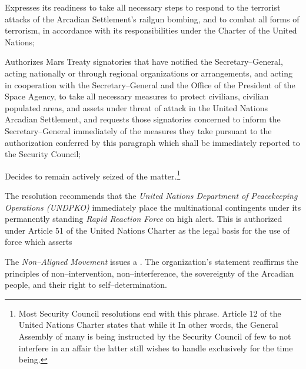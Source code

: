 \item Expresses its readiness to take all necessary steps to respond to the terrorist attacks of the Arcadian Settlement's railgun bombing, and to combat all forms of terrorism, in accordance with its responsibilities under the Charter of the United Nations;

\item Authorizes Mars Treaty signatories that have notified the Secretary--General, acting nationally or through regional organizations or arrangements, and acting in cooperation with the Secretary--General and the Office of the President of the Space Agency, to take all necessary measures to protect civilians, civilian populated areas, and assets under threat of attack in the United Nations Arcadian Settlement, and requests those signatories concerned to inform the Secretary--General immediately of the measures they take pursuant to the authorization conferred by this paragraph which shall be immediately reported to the Security Council;

\item Decides to remain actively seized of the matter.\footnote{Most Security Council resolutions end with this phrase. Article 12 of the United Nations Charter states that while it  In other words, the General Assembly of many is being instructed by the Security Council of few to not interfere in an affair the latter still wishes to handle exclusively for the time being.}
\stopitemize
\stopTimelineGeneralDocument

The resolution recommends that the {\it United Nations Department of Peacekeeping Operations (UNDPKO)} immediately place the multinational contingents under its permanently standing {\it Rapid Reaction Force} on high alert. This is authorized under Article 51 of the United Nations Charter as the legal basis for the use of force which asserts 
\StopTimelineDate

The {\it Non--Aligned Movement} issues a . The organization's statement reaffirms the principles of non--intervention, non--interference, the sovereignty of the Arcadian people, and their right to self--determination.

